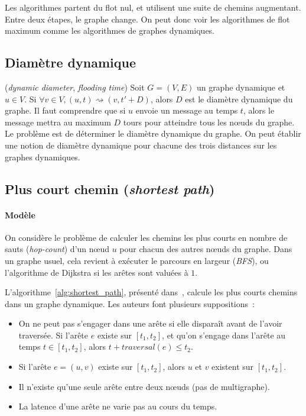 \documentclass[12pt,a4paper]{article}
\begin{document}
Les algorithmes partent du flot nul, et utilisent une suite de chemins
augmentant. Entre deux étapes, le graphe change. On peut donc voir les
algorithmes de flot maximum comme les algorithmes de graphes
dynamiques.

\subsection{Diamètre dynamique}
(\textit{dynamic diameter}, \textit{flooding time}) Soit
\(G = (V, E)\) un graphe dynamique et \(u \in V\). Si
\(\forall v \in V, (u, t) \rightsquigarrow (v, t' + D)\), alors \(D\)
est le diamètre dynamique du graphe. Il faut comprendre que si \(u\)
envoie un message au temps \(t\), alors le message mettra au maximum
\(D\) tours pour atteindre tous les nœuds du graphe. Le problème est
de déterminer le diamètre dynamique du graphe. On peut établir une
notion de diamètre dynamique pour chacune des trois distances sur les
graphes dynamiques.

\subsection{Plus court chemin (\textit{shortest path})}

\paragraph{Modèle}
On considère le problème de calculer les chemins les plus courts en
nombre de sauts (\textit{hop-count}) d'un nœud \(u\) pour chacun des
autres nœuds du graphe. Dans un graphe usuel, cela revient à exécuter
le parcours en largeur (\textit{BFS}), ou l'algorithme de Dijkstra si
les arêtes sont valuées à \(1\).

L'algorithme~\ref{alg:shortest_path}, présenté
dans~\cite{DBLP:journals/ijfcs/XuanFJ03}, calcule les plus courts
chemins dans un graphe dynamique. Les auteurs font plusieurs
suppositions~:
\begin{itemize}
\item On ne peut pas s'engager dans une arête si elle disparaît avant
  de l'avoir traversée. Si l'arête \(e\) existe sur \([t_1, t_2]\), et
  qu'on s'engage dans l'arête au temps \(t \in [t_1, t_2]\), alors
  \(t + traversal(e) \leq t_2\).
\item Si l'arête \(e = (u, v)\) existe sur \([t_1, t_2]\), alors \(u\)
  et \(v\) existent sur \([t_1, t_2]\).
\item Il n'existe qu'une seule arête entre deux nœuds (pas de
  multigraphe).
\item La latence d'une arête ne varie pas au cours du temps.
\end{itemize}
\end{document}
